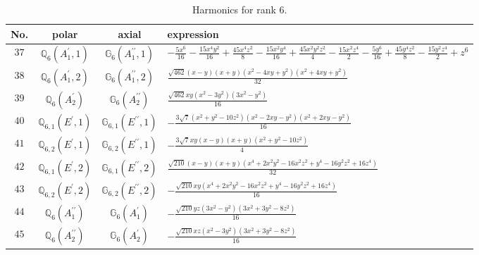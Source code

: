 \documentclass[fleqn,8pt,landscape]{jsarticle}
\begin{document}
\begin{table}[ht!]
\begin{center}
\caption{Harmonics for rank 6.}
\renewcommand{\arraystretch}{1.3}
\begin{tabular}{cccl} \hline \hline
No. & polar & axial & expression \\ \hline
$ 37 $ & $ \mathbb{Q}_{6}(A_{1}^{\prime},1) $ & $ \mathbb{G}_{6}(A_{1}^{\prime\prime},1) $ & $ - \frac{5 x^{6}}{16} - \frac{15 x^{4} y^{2}}{16} + \frac{45 x^{4} z^{2}}{8} - \frac{15 x^{2} y^{4}}{16} + \frac{45 x^{2} y^{2} z^{2}}{4} - \frac{15 x^{2} z^{4}}{2} - \frac{5 y^{6}}{16} + \frac{45 y^{4} z^{2}}{8} - \frac{15 y^{2} z^{4}}{2} + z^{6} $ \\
$ 38 $ & $ \mathbb{Q}_{6}(A_{1}^{\prime},2) $ & $ \mathbb{G}_{6}(A_{1}^{\prime\prime},2) $ & $ \frac{\sqrt{462} \left(x - y\right) \left(x + y\right) \left(x^{2} - 4 x y + y^{2}\right) \left(x^{2} + 4 x y + y^{2}\right)}{32} $ \\
$ 39 $ & $ \mathbb{Q}_{6}(A_{2}^{\prime}) $ & $ \mathbb{G}_{6}(A_{2}^{\prime\prime}) $ & $ \frac{\sqrt{462} x y \left(x^{2} - 3 y^{2}\right) \left(3 x^{2} - y^{2}\right)}{16} $ \\
$ 40 $ & $ \mathbb{Q}_{6,1}(E^{\prime},1) $ & $ \mathbb{G}_{6,1}(E^{\prime\prime},1) $ & $ - \frac{3 \sqrt{7} \left(x^{2} + y^{2} - 10 z^{2}\right) \left(x^{2} - 2 x y - y^{2}\right) \left(x^{2} + 2 x y - y^{2}\right)}{16} $ \\
$ 41 $ & $ \mathbb{Q}_{6,2}(E^{\prime},1) $ & $ \mathbb{G}_{6,2}(E^{\prime\prime},1) $ & $ - \frac{3 \sqrt{7} x y \left(x - y\right) \left(x + y\right) \left(x^{2} + y^{2} - 10 z^{2}\right)}{4} $ \\
$ 42 $ & $ \mathbb{Q}_{6,1}(E^{\prime},2) $ & $ \mathbb{G}_{6,1}(E^{\prime\prime},2) $ & $ \frac{\sqrt{210} \left(x - y\right) \left(x + y\right) \left(x^{4} + 2 x^{2} y^{2} - 16 x^{2} z^{2} + y^{4} - 16 y^{2} z^{2} + 16 z^{4}\right)}{32} $ \\
$ 43 $ & $ \mathbb{Q}_{6,2}(E^{\prime},2) $ & $ \mathbb{G}_{6,2}(E^{\prime\prime},2) $ & $ - \frac{\sqrt{210} x y \left(x^{4} + 2 x^{2} y^{2} - 16 x^{2} z^{2} + y^{4} - 16 y^{2} z^{2} + 16 z^{4}\right)}{16} $ \\
$ 44 $ & $ \mathbb{Q}_{6}(A_{1}^{\prime\prime}) $ & $ \mathbb{G}_{6}(A_{1}^{\prime}) $ & $ - \frac{\sqrt{210} y z \left(3 x^{2} - y^{2}\right) \left(3 x^{2} + 3 y^{2} - 8 z^{2}\right)}{16} $ \\
$ 45 $ & $ \mathbb{Q}_{6}(A_{2}^{\prime\prime}) $ & $ \mathbb{G}_{6}(A_{2}^{\prime}) $ & $ - \frac{\sqrt{210} x z \left(x^{2} - 3 y^{2}\right) \left(3 x^{2} + 3 y^{2} - 8 z^{2}\right)}{16} $ \\

\end{tabular}
\end{center}
\end{table}
\end{document}
